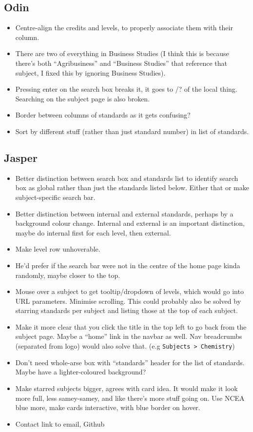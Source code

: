 \documentclass{article}
\begin{document}
\subsection*{Odin}
\begin{itemize}
    \item Centre-align the credits and levels, to properly associate them with their column.
    \item There are two of everything in Business Studies (I think this is because there's both ``Agribusiness'' and ``Business Studies'' that reference that subject, I fixed this by ignoring Business Studies). 
    \item Pressing enter on the search box breaks it, it goes to /? of the local thing. Searching on the subject page is also broken.
    \item Border between columns of standards as it gets confusing?
    \item Sort by different stuff (rather than just standard number) in list of standards.
\end{itemize}

\subsection*{Jasper}
\begin{itemize}
    \item Better distinction between search box and standards list to identify search box as global rather than just the standards listed below. Either that or make subject-specific search bar.
    \item Better distinction between internal and external standards, perhaps by a background colour change. Internal and external is an important distinction, maybe do internal first for each level, then external.
    \item Make level row unhoverable.
    \item He'd prefer if the search bar were not in the centre of the home page kinda randomly, maybe closer to the top.
    \item Mouse over a subject to get tooltip/dropdown of levels, which would go into URL parameters. Minimise scrolling. This could probably also be solved by starring standards per subject and listing those at the top of each subject.
    \item Make it more clear that you click the title in the top left to go back from the subject page. Maybe a ``home'' link in the navbar as well. Nav breadcrumbs (separated from logo) would also solve that. (e.g \texttt{Subjects > Chemistry})
    \item  Don't need whole-arse box with ``standards'' header for the list of standards. Maybe have a lighter-coloured background?
    \item Make starred subjects bigger, agrees with card idea. It would make it look more full, less samey-samey, and like there's more stuff going on. Use NCEA blue more, make cards interactive, with blue border on hover.
    \item Contact link to email, Github
\end{itemize}
\end{document}

